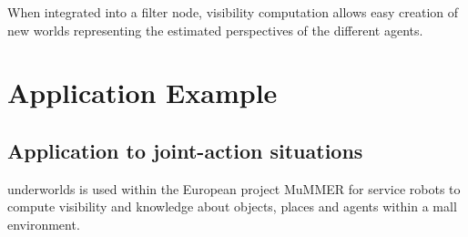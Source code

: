 \documentclass[letterpaper, 10pt, conference]{ieeeconf}
\newcommand{\uwds}{{\sc underworlds}\xspace}
\begin{document}
When integrated into a filter node, visibility computation allows easy
creation of new worlds representing the estimated perspectives of the different
agents.

%
%
%
%
%
%
%
%
%
%
%
%
%
%
%
%

\section{Application Example}
\label{application}

\subsection{Application to joint-action situations}

\uwds is used within the European project MuMMER for service robots to compute
visibility and knowledge about objects, places and agents within a mall
environment.
\end{document}
